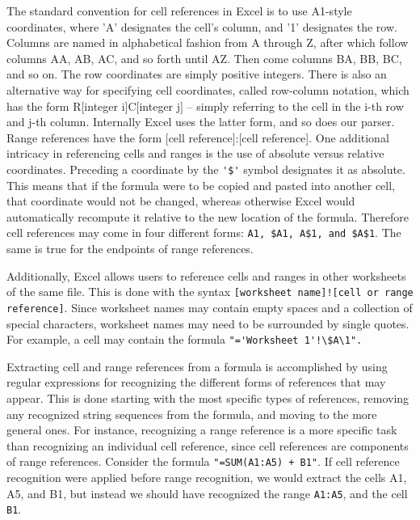 {The standard convention for cell references in Excel is to use A1-style
coordinates, where 'A' designates the cell's column, and '1' designates
the row.  Columns are named in alphabetical fashion from A through Z,
after which follow columns AA, AB, AC, and so forth until AZ. Then come
columns BA, BB, BC, and so on.  The row coordinates are simply positive
integers.  There is also an alternative way for specifying cell
coordinates, called row-column notation, which has the form
R[integer i]C[integer j] -- simply referring to the cell in the i-th row
and j-th column.  Internally Excel uses the latter form, and so does our
parser.  Range references have the form [cell reference]:[cell reference].
One additional intricacy in referencing cells and ranges is the use of
absolute versus relative coordinates.  Preceding a coordinate by the
\verb|'$'| symbol designates it as absolute.  This means that if the formula
were to be copied and pasted into another cell, that coordinate would not
be changed, whereas otherwise Excel would automatically recompute it
relative to the new location of the formula.  Therefore cell references
may come in four different forms: \verb|A1, $A1, A$1, and $A$1|.  The same is
true for the endpoints of range references.

Additionally, Excel allows users to reference cells and ranges in other
worksheets of the same file. This is done with the syntax
\verb|[worksheet name]![cell or range reference]|. Since worksheet names may contain
empty spaces and a collection of special characters, worksheet names may
need to be surrounded by single quotes.  For example, a cell may contain the
formula \verb|"='Worksheet 1'!\$A\1".|

Extracting cell and range references from a formula is accomplished by
using regular expressions for recognizing the different forms of references
that may appear.  This is done starting with the most specific types of
references, removing any recognized string sequences from the formula,
and moving to the more general ones.  For instance, recognizing a range
reference is a more specific task than recognizing an individual cell
reference, since cell references are components of range references.  Consider
the formula \verb|"=SUM(A1:A5) + B1"|. If cell reference recognition were applied
before range recognition, we would extract the cells A1, A5, and B1, but instead
we should have recognized the range \verb|A1:A5|, and the cell \verb|B1|.

}
